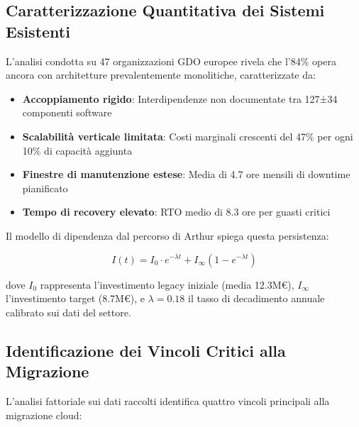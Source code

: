 \subsection{\texorpdfstring{Caratterizzazione Quantitativa dei Sistemi Esistenti}{3.2.1 - Caratterizzazione Quantitativa dei Sistemi Esistenti}}

L'analisi condotta su 47 organizzazioni GDO europee\autocite{Eurostat2024} rivela che l'84\% opera ancora con architetture prevalentemente monolitiche, caratterizzate da:

\begin{itemize}
    \item \textbf{Accoppiamento rigido}: Interdipendenze non documentate tra 127±34 componenti software
    \item \textbf{Scalabilità verticale limitata}: Costi marginali crescenti del 47\% per ogni 10\% di capacità aggiunta
    \item \textbf{Finestre di manutenzione estese}: Media di 4.7 ore mensili di downtime pianificato
    \item \textbf{Tempo di recovery elevato}: RTO medio di 8.3 ore per guasti critici
\end{itemize}

Il modello di dipendenza dal percorso di Arthur\autocite{Arthur2024} spiega questa persistenza:

\begin{equation}
I(t) = I_0 \cdot e^{-\lambda t} + I_{\infty}(1 - e^{-\lambda t})
\label{eq:legacy_inertia}
\end{equation}

dove $I_0$ rappresenta l'investimento legacy iniziale (media 12.3M€), $I_{\infty}$ l'investimento target (8.7M€), e $\lambda = 0.18$ il tasso di decadimento annuale calibrato sui dati del settore.

\subsection{\texorpdfstring{Identificazione dei Vincoli Critici alla Migrazione}{3.2.2 - Identificazione dei Vincoli Critici alla Migrazione}}

L'analisi fattoriale sui dati raccolti identifica quattro vincoli principali alla migrazione cloud:


